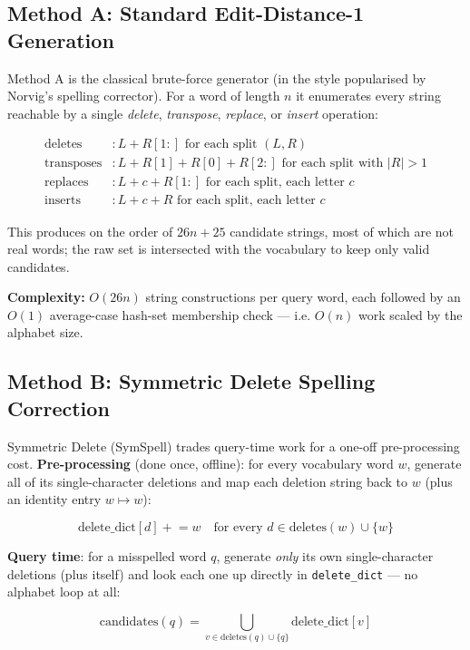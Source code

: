 \documentclass[11pt]{article}
\begin{document}
\subsection{Method A: Standard Edit-Distance-1 Generation}

Method A is the classical brute-force generator (in the style popularised by Norvig's spelling corrector). For a word of length $n$ it enumerates every string reachable by a single \textit{delete}, \textit{transpose}, \textit{replace}, or \textit{insert} operation:

\[
\begin{aligned}
\text{deletes} &: L + R[1:] \text{ for each split } (L, R) \\
\text{transposes} &: L + R[1] + R[0] + R[2:] \text{ for each split with } |R| > 1 \\
\text{replaces} &: L + c + R[1:] \text{ for each split, each letter } c \\
\text{inserts} &: L + c + R \text{ for each split, each letter } c
\end{aligned}
\]

This produces on the order of $26n + 25$ candidate strings, most of which are not real words; the raw set is intersected with the vocabulary to keep only valid candidates.

\textbf{Complexity:} $O(26n)$ string constructions per query word, each followed by an $O(1)$ average-case hash-set membership check --- i.e. $O(n)$ work scaled by the alphabet size.

\subsection{Method B: Symmetric Delete Spelling Correction}

Symmetric Delete (SymSpell) trades query-time work for a one-off pre-processing cost. \textbf{Pre-processing} (done once, offline): for every vocabulary word $w$, generate all of its single-character deletions and map each deletion string back to $w$ (plus an identity entry $w \mapsto w$):

\[
\text{delete\_dict}[d] \mathrel{+}= w \quad \text{for every } d \in \text{deletes}(w) \cup \{w\}
\]

\textbf{Query time}: for a misspelled word $q$, generate \textit{only} its own single-character deletions (plus itself) and look each one up directly in \texttt{delete\_dict} --- no alphabet loop at all:

\[
\text{candidates}(q) = \bigcup_{v \in \text{deletes}(q) \cup \{q\}} \text{delete\_dict}[v]
\]
\end{document}
